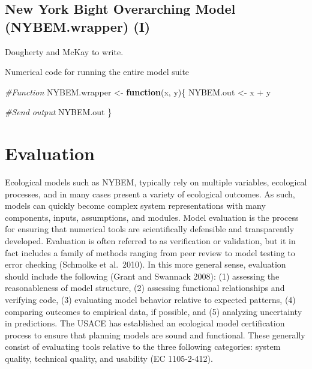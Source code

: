 \documentclass[
]{book}
\newenvironment{Shaded}{\begin{snugshade}}{\end{snugshade}}
\newcommand{\CommentTok}[1]{\textcolor[rgb]{0.56,0.35,0.01}{\textit{#1}}}
\newcommand{\ControlFlowTok}[1]{\textcolor[rgb]{0.13,0.29,0.53}{\textbf{#1}}}
\newcommand{\NormalTok}[1]{#1}
\newcommand{\OtherTok}[1]{\textcolor[rgb]{0.56,0.35,0.01}{#1}}
\newcommand{\SpecialCharTok}[1]{\textcolor[rgb]{0.00,0.00,0.00}{#1}}
\begin{document}
\hypertarget{new-york-bight-overarching-model-nybem.wrapper-i}{%
\section{New York Bight Overarching Model (NYBEM.wrapper) (I)}\label{new-york-bight-overarching-model-nybem.wrapper-i}}

{Dougherty and McKay to write.}

Numerical code for running the entire model suite

\begin{Shaded}
\begin{Highlighting}[]
\CommentTok{\#Function }
\NormalTok{NYBEM.wrapper }\OtherTok{\textless{}{-}} \ControlFlowTok{function}\NormalTok{(x, y)\{}
\NormalTok{  NYBEM.out }\OtherTok{\textless{}{-}}\NormalTok{ x }\SpecialCharTok{+}\NormalTok{ y}

  \CommentTok{\#Send output}
\NormalTok{  NYBEM.out}
\NormalTok{\}}
\end{Highlighting}
\end{Shaded}

\hypertarget{evaluation}{%
\chapter{Evaluation}\label{evaluation}}

Ecological models such as NYBEM, typically rely on multiple variables, ecological processes, and in many cases present a variety of ecological outcomes. As such, models can quickly become complex system representations with many components, inputs, assumptions, and modules. Model evaluation is the process for ensuring that numerical tools are scientifically defensible and transparently developed. Evaluation is often referred to as verification or validation, but it in fact includes a family of methods ranging from peer review to model testing to error checking (Schmolke et al.~2010). In this more general sense, evaluation should include the following (Grant and Swannack 2008): (1) assessing the reasonableness of model structure, (2) assessing functional relationships and verifying code, (3) evaluating model behavior relative to expected patterns, (4) comparing outcomes to empirical data, if possible, and (5) analyzing uncertainty in predictions. The USACE has established an ecological model certification process to ensure that planning models are sound and functional. These generally consist of evaluating tools relative to the three following categories: system quality, technical quality, and usability (EC 1105-2-412).
\end{document}
